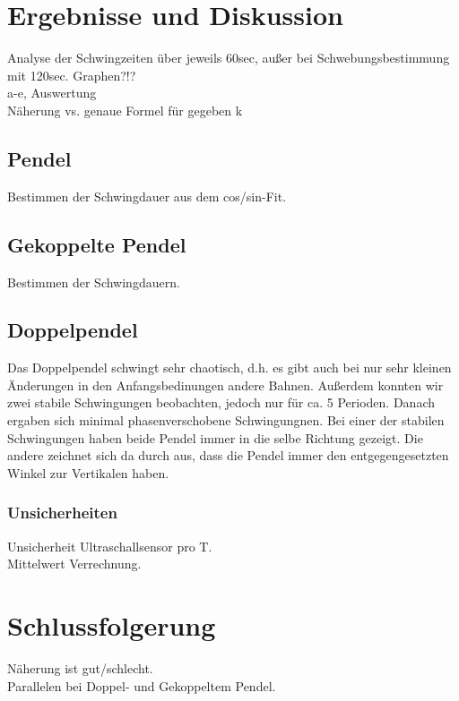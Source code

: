 \documentclass[
	a4paper,
	12pt,
	pagesize,
	ngerman
]{scrartcl}
\begin{document}
	\section{Ergebnisse und Diskussion}
	Analyse der Schwingzeiten über jeweils 60sec, außer bei Schwebungsbestimmung mit 120sec. Graphen?!? \\
	a-e, Auswertung \\
	Näherung vs. genaue Formel für gegeben k

	\subsection{Pendel}
	Bestimmen der Schwingdauer aus dem cos/sin-Fit.

	\subsection{Gekoppelte Pendel}
	Bestimmen der Schwingdauern.

	\subsection{Doppelpendel}
	Das Doppelpendel schwingt sehr chaotisch, d.h. es gibt auch bei nur sehr kleinen Änderungen in den Anfangsbedinungen andere Bahnen. Außerdem konnten wir zwei stabile Schwingungen beobachten, jedoch nur für ca. 5 Perioden. Danach ergaben sich minimal phasenverschobene Schwingungnen. Bei einer der stabilen Schwingungen haben beide Pendel immer in die selbe Richtung gezeigt. Die andere zeichnet sich da durch aus, dass die Pendel immer den entgegengesetzten Winkel zur Vertikalen haben. 
	
	\subsubsection*{Unsicherheiten}
	Unsicherheit Ultraschallsensor pro T. \\
	Mittelwert Verrechnung.

	\section{Schlussfolgerung}
	Näherung ist gut/schlecht. \\
	Parallelen bei Doppel- und Gekoppeltem Pendel.
	
\end{document}

